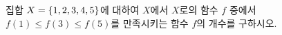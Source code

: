 집합 $X=\{1{,}\mkern3mu\mathopen{}2{,}\mkern3mu\mathopen{}3{,}\mkern3mu\mathopen{}4{,}\mkern3mu\mathopen{}5\}$에 대하여 $X$에서 $X$로의 함수 $f$ 중에서 $f(1)\le f(3)\le f(5)$를 만족시키는 함수 $f$의 개수를 구하시오.
